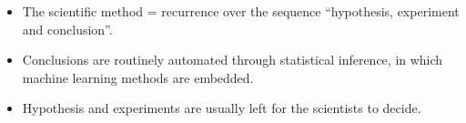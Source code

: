\documentclass{beamer}
\begin{document}
\begin{frame}
    \vspace{0.5cm}

    {\small

    \begin{itemize}
        \item The scientific method = recurrence over the sequence ``hypothesis, experiment and conclusion''.
        \item Conclusions are routinely automated through statistical inference, in which machine learning methods are embedded.
        \item Hypothesis and experiments are usually left for the scientists to decide.
    \end{itemize}}

\end{frame}
\end{document}
